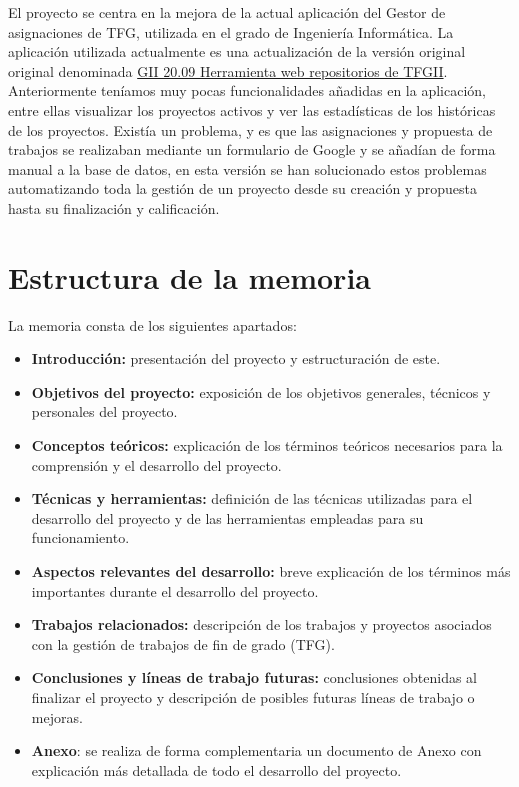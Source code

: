 
El proyecto se centra en la mejora de la actual aplicación del Gestor de asignaciones de TFG, utilizada en el grado de Ingeniería Informática. La aplicación utilizada actualmente es una actualización de la versión original original denominada \href{https://github.com/dbo1001/Gestor-TFG-2021}{GII 20.09 Herramienta web
repositorios de TFGII}. 
Anteriormente teníamos muy pocas funcionalidades añadidas en la aplicación, entre ellas visualizar los proyectos activos y ver las estadísticas de los históricas de los proyectos. Existía un problema, y es que las asignaciones y propuesta de trabajos se realizaban mediante un formulario de Google y se añadían de forma manual a la base de datos, en esta versión se han solucionado estos problemas automatizando toda la gestión de un proyecto desde su creación y propuesta hasta su finalización y calificación.


\section{Estructura de la memoria}
La memoria consta de los siguientes apartados:

\begin{itemize}
	\item \textbf{Introducción:} presentación del proyecto y estructuración de este.
	\item \textbf{Objetivos del proyecto:}  exposición de los  objetivos generales, técnicos y personales del proyecto.
	\item \textbf{Conceptos teóricos:} explicación de los términos teóricos necesarios para la comprensión y el desarrollo del proyecto.
	\item \textbf{Técnicas y herramientas:} definición de las técnicas utilizadas para el desarrollo del proyecto y de las herramientas empleadas para su funcionamiento.
	\item \textbf{Aspectos relevantes del desarrollo:} breve explicación de los términos más importantes durante el desarrollo del proyecto.
	\item \textbf{Trabajos relacionados:} descripción de los trabajos y proyectos asociados con la gestión de trabajos de fin de grado (TFG).
	\item \textbf{Conclusiones y líneas de trabajo futuras:} conclusiones obtenidas al finalizar el proyecto y descripción de posibles futuras líneas de trabajo o mejoras.
	\item \textbf{Anexo}: se realiza de forma complementaria un documento de Anexo con explicación más detallada de todo el desarrollo del proyecto.
\end{itemize}